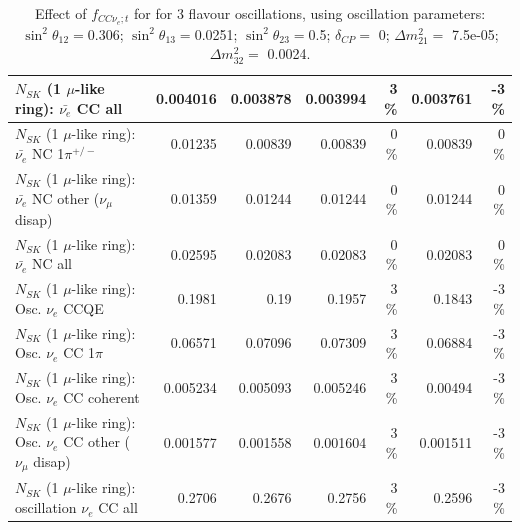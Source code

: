 \begin{table}
\begin{tabular}{| l | r | r | r  r | r  r |}
                            $N_{SK}$ (1 $\mu$-like ring): $\bar{\nu_{e}}$ CC all &        0.004016 &        0.003878 &        0.003994 &        3 \%  &        0.003761 &       -3 \%  \\ 
\hline
                     $N_{SK}$ (1 $\mu$-like ring): $\bar{\nu_e}$ NC 1$\pi^{+/-}$ &         0.01235 &         0.00839 &         0.00839 &        0 \%  &         0.00839 &        0 \%  \\ 
          $N_{SK}$ (1 $\mu$-like ring): $\bar{\nu_e}$ NC other ($\nu_\mu$ disap) &         0.01359 &         0.01244 &         0.01244 &        0 \%  &         0.01244 &        0 \%  \\ 
                            $N_{SK}$ (1 $\mu$-like ring): $\bar{\nu_{e}}$ NC all &         0.02595 &         0.02083 &         0.02083 &        0 \%  &         0.02083 &        0 \%  \\ 
\hline
\hline
\hline
                                 $N_{SK}$ (1 $\mu$-like ring): Osc. $\nu_e$ CCQE &          0.1981 &            0.19 &          0.1957 &        3 \%  &          0.1843 &       -3 \%  \\ 
                            $N_{SK}$ (1 $\mu$-like ring): Osc. $\nu_e$ CC 1$\pi$ &         0.06571 &         0.07096 &         0.07309 &        3 \%  &         0.06884 &       -3 \%  \\ 
                          $N_{SK}$ (1 $\mu$-like ring): Osc. $\nu_e$ CC coherent &        0.005234 &        0.005093 &        0.005246 &        3 \%  &         0.00494 &       -3 \%  \\ 
           $N_{SK}$ (1 $\mu$-like ring): Osc. $\nu_e$ CC other ($\nu_\mu$ disap) &        0.001577 &        0.001558 &        0.001604 &        3 \%  &        0.001511 &       -3 \%  \\ 
                        $N_{SK}$ (1 $\mu$-like ring): oscillation $\nu_e$ CC all &          0.2706 &          0.2676 &          0.2756 &        3 \%  &          0.2596 &       -3 \%  \\ 
\hline
\hline
\end{tabular}
\caption{ Effect of $f_{CC\nu_e; t}$ for for 3 flavour oscillations, using oscillation parameters:  $\sin^2\theta_{12} = $0.306; $\sin^2\theta_{13} = $0.0251; $\sin^2\theta_{23} = $0.5; $\delta_{CP} = $        0; $\Delta m^2_{21} = $    7.5e-05; $\Delta m^2_{32} = $    0.0024. }
\label{tab:num_xsec_norm_nuetonumu_1RmuT_3f_osc_t13:0.0251}
\end{table}
\clearpage
